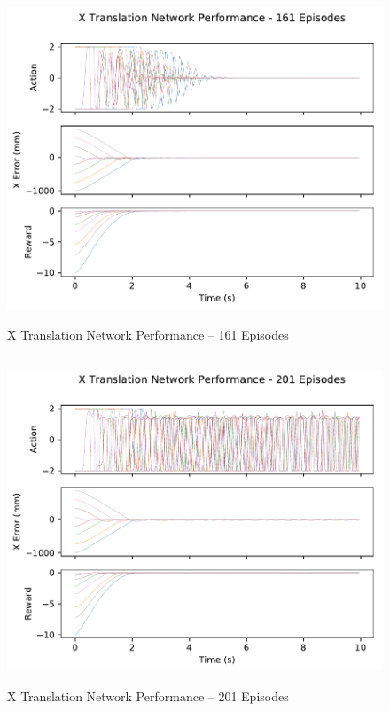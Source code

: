 \begin{figure}[H]
	\centering
	\includegraphics[width=6in, height=3.85in, keepaspectratio]{figures/train_figs/transx_transitions/1_161.pdf}
	\caption{X Translation Network Performance -- 161 Episodes}
\end{figure}
\begin{figure}[H]
	\centering
	\includegraphics[width=6in, height=3.85in, keepaspectratio]{figures/train_figs/transx_transitions/1_201.pdf}
	\caption{X Translation Network Performance -- 201 Episodes}
\end{figure}
